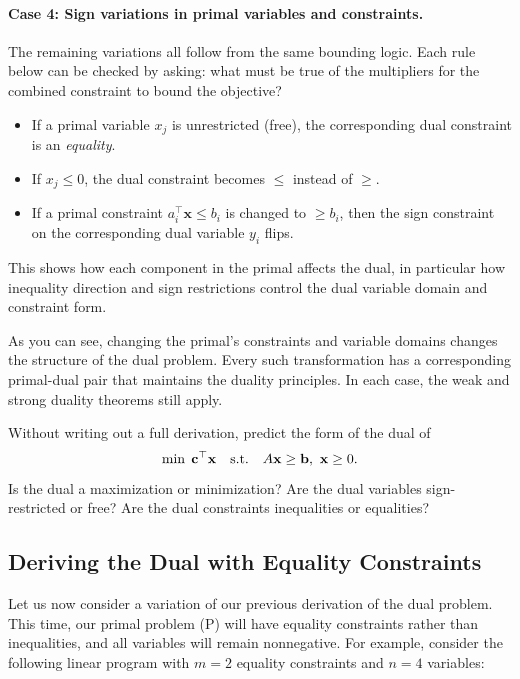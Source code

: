 \paragraph{Case 4: Sign variations in primal variables and constraints.}
The remaining variations all follow from the same bounding logic.  Each rule below can be checked by asking: what must be true of the multipliers for the combined constraint to bound the objective?

\begin{itemize}
  \item If a primal variable \( x_j \) is unrestricted (free), the corresponding dual constraint is an \emph{equality}.
  \item If \( x_j \leq 0 \), the dual constraint becomes \( \leq \) instead of \( \geq \).
  \item If a primal constraint \( a_i^\top \mathbf{x} \leq b_i \) is changed to \( \geq b_i \), then the sign constraint on the corresponding dual variable \( y_i \) flips.
\end{itemize}

This shows how each component in the primal affects the dual, in particular how inequality direction and sign restrictions control the dual variable domain and constraint form.

As you can see, changing the primal’s constraints and variable domains changes the structure of the dual problem. Every such transformation has a corresponding primal-dual pair that maintains the duality principles. In each case, the weak and strong duality theorems still apply.

\begin{learningcheckpoint}[label={lc:dual-forms}]
Without writing out a full derivation, predict the form of the dual of
\[
\min\; \mathbf{c}^\top \mathbf{x} \quad \mbox{s.t.}\quad A\mathbf{x} \geq \mathbf{b},\ \mathbf{x} \geq 0.
\]
Is the dual a maximization or minimization?  Are the dual variables sign-restricted or free?  Are the dual constraints inequalities or equalities?
\end{learningcheckpoint}

\subsection*{Deriving the Dual with Equality Constraints}

Let us now consider a variation of our previous derivation of the dual problem. This time, our primal problem (P) will have equality constraints rather than inequalities, and all variables will remain nonnegative. For example, consider the following linear program with $m=2$ equality constraints and $n=4$ variables:

